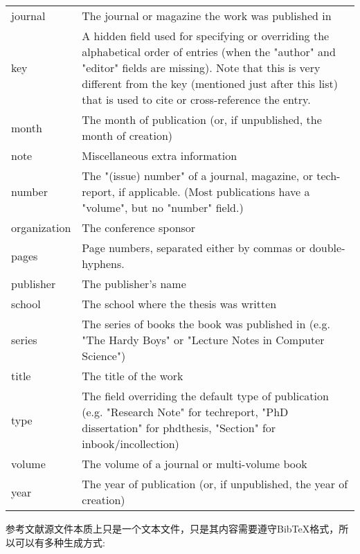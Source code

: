 \documentclass[twoside]{article} %
\begin{document}
\begin{table}[!htb]
\begin{tabular}{p{3cm}p{12cm}}
journal &
The journal or magazine the work was published in \\

key &
A hidden field used for specifying or overriding the alphabetical order of entries (when the "author" and "editor" fields are missing). Note that this is very different from the key (mentioned just after this list) that is used to cite or cross-reference the entry.\\

month &
The month of publication (or, if unpublished, the month of creation) \\

note &
Miscellaneous extra information \\

number &
The "(issue) number" of a journal, magazine, or tech-report, if applicable. (Most publications have a "volume", but no "number" field.) \\

organization &
The conference sponsor \\

pages &
Page numbers, separated either by commas or double-hyphens. \\

publisher &
The publisher's name \\

school &
The school where the thesis was written \\

series &
The series of books the book was published in (e.g. "The Hardy Boys" or "Lecture Notes in Computer Science") \\

title &
The title of the work \\

type &
The field overriding the default type of publication (e.g. "Research Note" for techreport, "{PhD} dissertation" for phdthesis, "Section" for inbook/incollection) \\

volume &
The volume of a journal or multi-volume book \\

year &
The year of publication (or, if unpublished, the year of creation) \\ \hline
    \end{tabular}
\end{table}%


参考文献源文件本质上只是一个文本文件，只是其内容需要遵守BibTeX格式，所以可以有多种生成方式:
\end{document}
